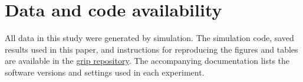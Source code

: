 \documentclass[11pt]{article}
\begin{document}
\section*{Data and code availability}
All data in this study were generated by simulation. The simulation code,
saved results used in this paper, and instructions for reproducing the figures
and tables are available in the
\href{https://github.com/pgajer/grip}{grip repository}.
The accompanying documentation lists the software versions and settings used
in each experiment.

\begingroup
\small
\setlength{\bibsep}{5pt}


\endgroup
\end{document}
